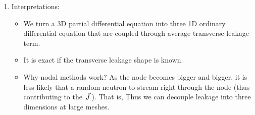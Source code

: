 \documentclass{school-22.211-notes}
\begin{document}
\begin{enumerate}
\item Interpretations: 
  \begin{itemize}
  \item We turn a 3D partial differential equation into three 1D ordinary differential equation that are coupled through average transverse leakage term. 
  \item It is exact if the transverse leakage shape is known. 
  \item Why nodal methods work? As the node becomes bigger and bigger, it is less likely that a random neutron to stream right through the node (thus contributing to the $\left.\vec{J}\right.$). That is,  Thus we can decouple leakage into three dimensions at large meshes. 
  \end{itemize}


\end{enumerate}
\end{document}
